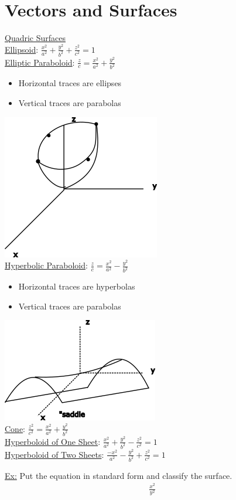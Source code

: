 \documentclass[12pt]{article}
\begin{document}
\section{Vectors and Surfaces}

\underline{Quadric Surfaces}\\%
\underline{Ellipsoid}: $\frac{x^2}{a^2}+\frac{y^2}{b^2}+\frac{z^2}{c^2}=1$\\%
\underline{Elliptic Paraboloid}: $\frac{z}{c}=\frac{x^2}{a^2}+\frac{y^2}{b^2}$
\begin{itemize}
	\item Horizontal traces are ellipses
	\item Vertical traces are parabolas
\end{itemize}
\includegraphics{parabaloid}\\%
\underline{Hyperbolic Paraboloid}: $\frac{z}{c}=\frac{x^2}{a^2}-\frac{y^2}{b^2}$
\begin{itemize}
	\item Horizontal traces are hyperbolas
	\item Vertical traces are parabolas
\end{itemize}
\includegraphics{saddle}\\%
\underline{Cone}: $\frac{z^2}{c^2}=\frac{x^2}{a^2}+\frac{y^2}{b^2}$\\%
\underline{Hyperboloid of One Sheet}: $\frac{x^2}{a^2}+\frac{y^2}{b^2}-\frac{z^2}{c^2}=1$\\%
\underline{Hyperboloid of Two Sheets}: $\frac{-x^2}{a^2}-\frac{y^2}{b^2}+\frac{z^2}{c^2}=1$\

\underline{Ex:} Put the equation in standard form and classify the surface.
\begin{align}
	\frac{x^2}{y^2}
\end{align}
	
\end{document}
